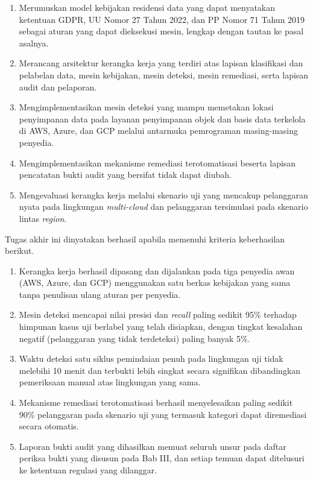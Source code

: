 \begin{enumerate}

\item Merumuskan model kebijakan residensi data yang dapat menyatakan ketentuan GDPR, UU Nomor 27 Tahun 2022, dan PP Nomor 71 Tahun 2019 sebagai aturan yang dapat dieksekusi mesin, lengkap dengan tautan ke pasal asalnya.

\item Merancang arsitektur kerangka kerja yang terdiri atas lapisan klasifikasi dan pelabelan data, mesin kebijakan, mesin deteksi, mesin remediasi, serta lapisan audit dan pelaporan.

\item Mengimplementasikan mesin deteksi yang mampu memetakan lokasi penyimpanan data pada layanan penyimpanan objek dan basis data terkelola di AWS, Azure, dan GCP melalui antarmuka pemrograman masing-masing penyedia.

\item Mengimplementasikan mekanisme remediasi terotomatisasi beserta lapisan pencatatan bukti audit yang bersifat tidak dapat diubah.

\item Mengevaluasi kerangka kerja melalui skenario uji yang mencakup pelanggaran nyata pada lingkungan \textit{multi-cloud} dan pelanggaran tersimulasi pada skenario lintas \textit{region}.

\end{enumerate}

Tugas akhir ini dinyatakan berhasil apabila memenuhi kriteria keberhasilan berikut.

\begin{enumerate}[label=\alph*.]

\item Kerangka kerja berhasil dipasang dan dijalankan pada tiga penyedia awan (AWS, Azure, dan GCP) menggunakan satu berkas kebijakan yang sama tanpa penulisan ulang aturan per penyedia.

\item Mesin deteksi mencapai nilai presisi dan \textit{recall} paling sedikit 95\% terhadap himpunan kasus uji berlabel yang telah disiapkan, dengan tingkat kesalahan negatif (pelanggaran yang tidak terdeteksi) paling banyak 5\%.

\item Waktu deteksi satu siklus pemindaian penuh pada lingkungan uji tidak melebihi 10 menit dan terbukti lebih singkat secara signifikan dibandingkan pemeriksaan manual atas lingkungan yang sama.

\item Mekanisme remediasi terotomatisasi berhasil menyelesaikan paling sedikit 90\% pelanggaran pada skenario uji yang termasuk kategori dapat diremediasi secara otomatis.

\item Laporan bukti audit yang dihasilkan memuat seluruh unsur pada daftar periksa bukti yang disusun pada Bab III, dan setiap temuan dapat ditelusuri ke ketentuan regulasi yang dilanggar.

\end{enumerate}


